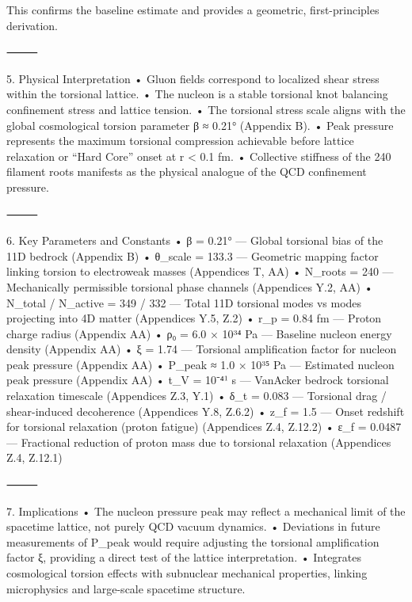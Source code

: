 This confirms the baseline estimate and provides a geometric, first-principles derivation.

⸻

5. Physical Interpretation
	•	Gluon fields correspond to localized shear stress within the torsional lattice.
	•	The nucleon is a stable torsional knot balancing confinement stress and lattice tension.
	•	The torsional stress scale aligns with the global cosmological torsion parameter β ≈ 0.21° (Appendix B).
	•	Peak pressure represents the maximum torsional compression achievable before lattice relaxation or “Hard Core” onset at r < 0.1 fm.
	•	Collective stiffness of the 240 filament roots manifests as the physical analogue of the QCD confinement pressure.

⸻

6. Key Parameters and Constants
	•	β = 0.21° — Global torsional bias of the 11D bedrock (Appendix B)
	•	θ_scale = 133.3 — Geometric mapping factor linking torsion to electroweak masses (Appendices T, AA)
	•	N_roots = 240 — Mechanically permissible torsional phase channels (Appendices Y.2, AA)
	•	N_total / N_active = 349 / 332 — Total 11D torsional modes vs modes projecting into 4D matter (Appendices Y.5, Z.2)
	•	r_p = 0.84 fm — Proton charge radius (Appendix AA)
	•	ρ₀ = 6.0 × 10³⁴ Pa — Baseline nucleon energy density (Appendix AA)
	•	ξ = 1.74 — Torsional amplification factor for nucleon peak pressure (Appendix AA)
	•	P_peak ≈ 1.0 × 10³⁵ Pa — Estimated nucleon peak pressure (Appendix AA)
	•	t_V = 10⁻⁴¹ s — VanAcker bedrock torsional relaxation timescale (Appendices Z.3, Y.1)
	•	δ_t = 0.083 — Torsional drag / shear-induced decoherence (Appendices Y.8, Z.6.2)
	•	z_f = 1.5 — Onset redshift for torsional relaxation (proton fatigue) (Appendices Z.4, Z.12.2)
	•	ε_f = 0.0487 — Fractional reduction of proton mass due to torsional relaxation (Appendices Z.4, Z.12.1)

⸻

7. Implications
	•	The nucleon pressure peak may reflect a mechanical limit of the spacetime lattice, not purely QCD vacuum dynamics.
	•	Deviations in future measurements of P_peak would require adjusting the torsional amplification factor ξ, providing a direct test of the lattice interpretation.
	•	Integrates cosmological torsion effects with subnuclear mechanical properties, linking microphysics and large-scale spacetime structure.
